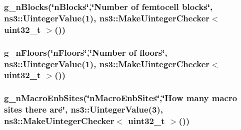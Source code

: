 \subsubsection[{\texorpdfstring{g\+\_\+n\+Blocks}{g_nBlocks}}]{ g\+\_\+n\+Blocks(\char`\"{}n\+Blocks\char`\"{},\char`\"{}Number of femtocell blocks\char`\"{}, ns3\+::\+Uinteger\+Value(1), {\bf ns3\+::\+Make\+Uinteger\+Checker}$<$ uint32\+\_\+t $>$())\hspace{0.3cm}{\ttfamily [static]}}\hypertarget{lena-dual-stripe_8cc_a24d1b790d687653b3cae54a6242a7b22}{}\label{lena-dual-stripe_8cc_a24d1b790d687653b3cae54a6242a7b22}
\subsubsection[{\texorpdfstring{g\+\_\+n\+Floors}{g_nFloors}}]{ g\+\_\+n\+Floors(\char`\"{}n\+Floors\char`\"{},\char`\"{}Number of floors\char`\"{}, ns3\+::\+Uinteger\+Value(1), {\bf ns3\+::\+Make\+Uinteger\+Checker}$<$ uint32\+\_\+t $>$())\hspace{0.3cm}{\ttfamily [static]}}\hypertarget{lena-dual-stripe_8cc_aff6a8c68afd9f992c5e6069ad2787e19}{}\label{lena-dual-stripe_8cc_aff6a8c68afd9f992c5e6069ad2787e19}
\subsubsection[{\texorpdfstring{g\+\_\+n\+Macro\+Enb\+Sites}{g_nMacroEnbSites}}]{ g\+\_\+n\+Macro\+Enb\+Sites(\char`\"{}n\+Macro\+Enb\+Sites\char`\"{},\char`\"{}How many macro sites there are\char`\"{}, ns3\+::\+Uinteger\+Value(3), {\bf ns3\+::\+Make\+Uinteger\+Checker}$<$ uint32\+\_\+t $>$())\hspace{0.3cm}{\ttfamily [static]}}\hypertarget{lena-dual-stripe_8cc_aca10e2f6779d3bd951248066f84bae18}{}\label{lena-dual-stripe_8cc_aca10e2f6779d3bd951248066f84bae18}
